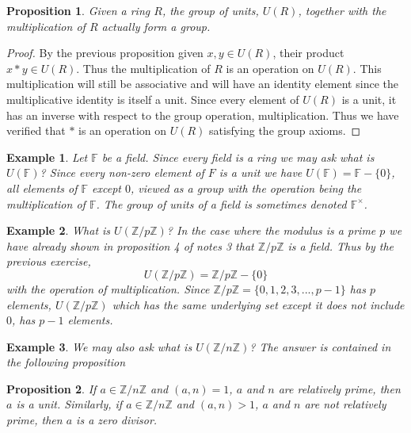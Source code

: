 \documentclass{article}
\theoremstyle{problemstyle}
\newtheorem{example}{Example}
\newtheorem{proposition}{Proposition}
\begin{document}
\begin{proposition}
Given a ring $R$, the group of units, $U(R)$, together with the multiplication of $R$ actually form a group. 
\end{proposition}

\begin{proof}
By the previous proposition given $x,y \in U(R)$, their product $x*y \in U(R)$. Thus the multiplication of $R$ is an operation on $U(R)$. This multiplication will still be associative and will have an identity element since the multiplicative identity is itself a unit. Since every element of $U(R)$ is a unit, it has an inverse with respect to the group operation, multiplication. Thus we have verified that $*$ is an operation on $U(R)$ satisfying the group axioms. 
\end{proof}

\begin{example}
Let $\mathbb{F}$ be a field. Since every field is a ring we may ask what is $U(\mathbb{F})$? Since every non-zero element of $F$ is a unit we have $U(\mathbb{F}) = \mathbb{F}-\{0\}$, all elements of $\mathbb{F}$ except $0$, viewed as a group with the operation being the multiplication of $\mathbb{F}$. The group of units of a field is sometimes denoted $\mathbb{F}^\times$.
\end{example}

\begin{example}
What is $U(\mathbb{Z}/p\mathbb{Z})$? In the case where the modulus is a prime $p$ we have already shown in proposition 4 of notes 3 that $\mathbb{Z}/p\mathbb{Z}$ is a field. Thus by the previous exercise,  $$U(\mathbb{Z}/p\mathbb{Z}) =  \mathbb{Z}/p\mathbb{Z} - \{0\}$$ with the operation of multiplication. Since $\mathbb{Z}/p\mathbb{Z} = \{0,1,2,3,...,p-1\}$ has $p$ elements, $U(\mathbb{Z}/p\mathbb{Z})$ which has the same underlying set except it does not include $0$, has $p-1$ elements. 
\end{example}

\begin{example}
We may also ask what is $U(\mathbb{Z}/n\mathbb{Z})$? The answer is contained in the following proposition
\end{example}

\begin{proposition}
If $a \in \mathbb{Z}/n\mathbb{Z}$ and $(a,n) = 1$, $a$ and $n$ are relatively prime, then $a$ is a unit. Similarly, if $a \in \mathbb{Z}/n\mathbb{Z}$ and $(a,n) > 1$, $a$ and $n$ are not relatively prime, then $a$ is a zero divisor.
\end{proposition}
\end{document}
